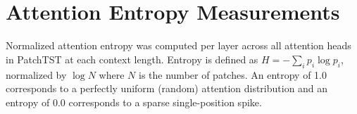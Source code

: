 \documentclass{article} %
\begin{document}
{





\section{Attention Entropy Measurements} \label{sec:entropy_appendix}
Normalized attention entropy was computed per layer across all attention heads in PatchTST at each context length. Entropy is defined as $H = -\sum_i p_i \log p_i$, normalized by $\log N$ where $N$ is the number of patches. An entropy of 1.0 corresponds to a perfectly uniform (random) attention distribution and an entropy of 0.0 corresponds to a sparse single-position spike.

}
\end{document}
